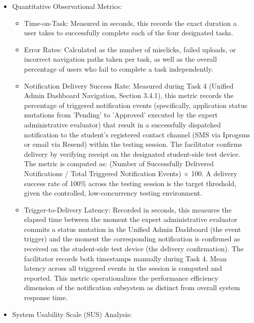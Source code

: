 \begin{itemize}
  \item Quantitative Observational Metrics:
  \begin{itemize}
    \item Time-on-Task: Measured in seconds, this records the exact duration a user takes to successfully complete each of the four designated tasks.
    \item Error Rates: Calculated as the number of misclicks, failed uploads, or incorrect navigation paths taken per task, as well as the overall percentage of users who fail to complete a task independently.
    \item Notification Delivery Success Rate: Measured during Task 4 (Unified Admin Dashboard Navigation, Section 3.4.1), this metric records the percentage of triggered notification events (specifically, application status mutations from 'Pending' to 'Approved' executed by the expert administrative evaluator) that result in a successfully dispatched notification to the student's registered contact channel (SMS via Iprogsms or email via Resend) within the testing session. The facilitator confirms delivery by verifying receipt on the designated student-side test device. The metric is computed as: (Number of Successfully Delivered Notifications / Total Triggered Notification Events) $\times$ 100. A delivery success rate of 100\% across the testing session is the target threshold, given the controlled, low-concurrency testing environment.
    \item Trigger-to-Delivery Latency: Recorded in seconds, this measures the elapsed time between the moment the expert administrative evaluator commits a status mutation in the Unified Admin Dashboard (the event trigger) and the moment the corresponding notification is confirmed as received on the student-side test device (the delivery confirmation). The facilitator records both timestamps manually during Task 4. Mean latency across all triggered events in the session is computed and reported. This metric operationalizes the performance efficiency dimension of the notification subsystem as distinct from overall system response time.
  \end{itemize}
  \item System Usability Scale (SUS) Analysis:
  \begin{itemize}

\end{itemize}
\end{itemize}
